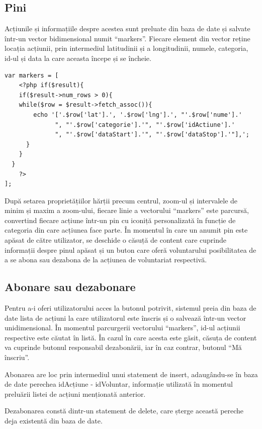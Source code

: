 \documentclass[12pt,a4paper]{report}
\begin{document}
\newpage
\subsection{Pini}
\par
Acțiunile și informațiile despre acestea sunt preluate din baza de date și salvate într-un vector bidimensional numit “markers”. Fiecare element din vector reține locația acțiunii, prin intermediul latitudinii și a longitudinii, numele, categoria, id-ul și data la care aceasta începe și se încheie.

\begin{lstlisting}
var markers = [
    <?php if($result){
    if($result->num_rows > 0){
    while($row = $result->fetch_assoc()){
        echo '['.$row['lat'].', '.$row['lng'].', "'.$row['nume'].'
              ", "'.$row['categorie'].'", "'.$row['idActiune'].'
              ", "'.$row['dataStart'].'", "'.$row['dataStop'].'"],';
      }
    }
  }
    ?>
];
\end{lstlisting}

\par
După setarea proprietățiilor hărții precum centrul, zoom-ul și intervalele de minim și maxim a zoom-ului, fiecare linie a vectorului “markers” este parcursă, convertind fiecare acțiune într-un pin cu iconiță personalizată în funcție de categoria din care acțiunea face parte. În momentul în care un anumit pin este apăsat de către utilizator, se deschide o căsuță de content care cuprinde informații despre pinul apăsat și un buton care oferă voluntarului posibilitatea de a se abona sau dezabona de la acțiunea de voluntariat respectivă.


\subsection{Abonare sau dezabonare}
\par
Pentru a-i oferi utilizatorului acces la butonul potrivit, sistemul preia din baza de date lista de acțiuni la care utilizatorul este înscris și o salvează într-un vector unidimensional. În momentul parcurgerii vectorului “markers”, id-ul acțiunii respective este căutat în listă. În cazul în care acesta este găsit, căsuța de content va cuprinde butonul responsabil dezabonării, iar în caz contrar, butonul  “Mă înscriu”.
\\
\par
Abonarea are loc prin intermediul unui statement de insert, adaugându-se în baza de date perechea idAcțiune - idVoluntar, informație utilizată în momentul preluării listei de acțiuni menționată anterior.
\\
\par
Dezabonarea constă dintr-un statement de delete, care șterge această pereche deja existentă din baza de date.
\end{document}
